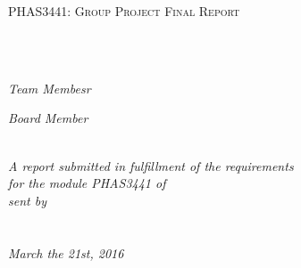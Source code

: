 \documentclass[11pt, english, singlespacing, headsepline,]{FinalReport}
\author{Andreas Angelis \textsc{Christou}, Edward \textsc{Mercer}, Iarom \textsc{Madden}, Gabriela \textsc{May Lagunes}, Mark \textsc{Jenie}, Omree \textsc{Naim}, Poonam \textsc{Sodha}, Sussie \textsc{Sujeeporn}}
\begin{document}
\frontmatter %

\pagestyle{plain} %


\begin{titlepage}
\begin{center}

{\scshape\LARGE \univname\par}\vspace{1.5cm} %
\textsc{\Large PHAS3441: Group Project Final Report}\\[0.5cm] 

\HRule \\[0.4cm] %
{\huge \bfseries \ttitle\par}\vspace{0.4cm} %
\HRule \\[1.5cm] %

\begin{minipage}[t]{0.4\textwidth}
\begin{flushleft} \large
\emph{Team Membesr}\\
\href{http://www.ucl.ac.uk}{\authorname} %
\end{flushleft}
\end{minipage}
\begin{minipage}[t]{0.4\textwidth}
\begin{flushright} \large
\emph{Board Member} \\
\href{https://iris.ucl.ac.uk/iris/browse/profile?upi=DBCAS57}{\supname} %
\end{flushright}
\end{minipage}\\[3cm]
 
\large \textit{A report submitted in fulfillment of the requirements\\ for the module PHAS3441 of \degreename}\\[0.3cm] %
\textit{sent by}\\[0.4cm]
\groupname\\\deptname\\[2cm] %
 
\textit{March the 21st, 2016}\\[4cm] %
 
\vfill
\end{center}
\end{titlepage}
\end{document}
